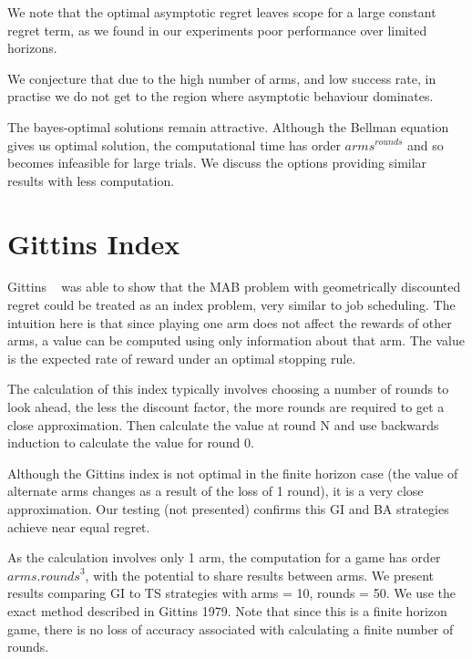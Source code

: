 \documentclass[11pt,a4,singlespacing,titlepagenumber=on]{scrreprt}
\numberwithin{equation}{chapter} %
\theoremstyle{remark}
\begin{document}
We note that the optimal asymptotic regret leaves scope for a large constant regret term, as we found in our experiments poor performance over limited horizons.

We conjecture that due to the high number of arms, and low success rate, in practise we do not get to the region where asymptotic behaviour dominates.

The bayes-optimal solutions remain attractive. Although the Bellman equation gives us optimal solution, the computational time has order ${arms}^{rounds}$ and so becomes infeasible for large trials. We discuss the options providing similar results with less computation.

\chapter{Gittins Index}
Gittins ~\cite{gittins1979bandit} was able to show that the MAB problem with geometrically discounted regret could be treated as an index problem, very similar to job scheduling. The intuition here is that since playing one arm does not affect the rewards of other arms, a value can be computed using only information about that arm. The value is the expected rate of reward under an optimal stopping rule.

The calculation of this index typically involves choosing a number of rounds to look ahead, the less the discount factor, the more rounds are required to get a close approximation. Then calculate the value at round N and use backwards induction to calculate the value for round 0.

Although the Gittins index is not optimal in the finite horizon case (the value of alternate arms changes as a result of the loss of 1 round), it is a very close approximation. Our testing (not presented) confirms this GI and BA strategies achieve near equal regret.

As the calculation involves only 1 arm, the computation for a game has order ${arms} .{rounds}^3$, with the potential to share results between arms. We present results comparing GI to TS strategies with arms = 10, rounds = 50. We use the exact method described in Gittins 1979. Note that since this is a finite horizon game, there is no loss of accuracy associated with calculating a finite number of rounds.
\end{document}
